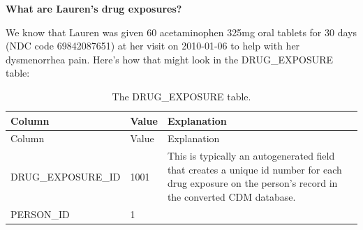 \documentclass[11pt]{book}
\begin{document}
\textbf{What are Lauren's drug exposures?}

We know that Lauren was given 60 acetaminophen 325mg oral tablets for 30
days (NDC code 69842087651) at her visit on 2010-01-06 to help with her
dysmenorrhea pain. Here's how that might look in the DRUG\_EXPOSURE
table:

\begin{longtable}[]{@{}lll@{}}
\caption{\label{tab:drugExposure} The DRUG\_EXPOSURE table.}\tabularnewline
\toprule
\begin{minipage}[b]{0.30\columnwidth}\raggedright\strut
Column\strut
\end{minipage} & \begin{minipage}[b]{0.14\columnwidth}\raggedright\strut
Value\strut
\end{minipage} & \begin{minipage}[b]{0.47\columnwidth}\raggedright\strut
Explanation\strut
\end{minipage}\tabularnewline
\midrule
\endfirsthead
\toprule
\begin{minipage}[b]{0.30\columnwidth}\raggedright\strut
Column\strut
\end{minipage} & \begin{minipage}[b]{0.14\columnwidth}\raggedright\strut
Value\strut
\end{minipage} & \begin{minipage}[b]{0.47\columnwidth}\raggedright\strut
Explanation\strut
\end{minipage}\tabularnewline
\midrule
\endhead
\begin{minipage}[t]{0.30\columnwidth}\raggedright\strut
DRUG\_EXPOSURE\_ID\strut
\end{minipage} & \begin{minipage}[t]{0.14\columnwidth}\raggedright\strut
1001\strut
\end{minipage} & \begin{minipage}[t]{0.47\columnwidth}\raggedright\strut
This is typically an autogenerated field that creates a unique id number
for each drug exposure on the person's record in the converted CDM
database.\strut
\end{minipage}\tabularnewline
\begin{minipage}[t]{0.30\columnwidth}\raggedright\strut
PERSON\_ID\strut
\end{minipage} & \begin{minipage}[t]{0.14\columnwidth}\raggedright\strut
1\strut
\end{minipage} & \begin{minipage}[t]{0.47\columnwidth}\raggedright\strut

\end{minipage}
\end{longtable}
\end{document}
